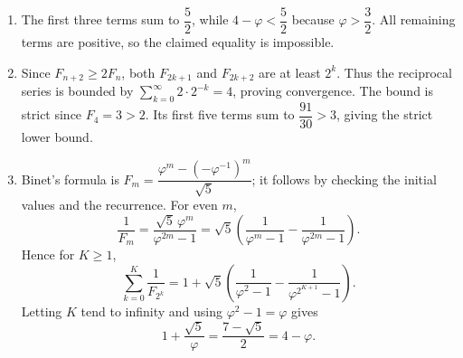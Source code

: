 \begin{enumerate}
\item The first three terms sum to $\dfrac{5}{2}$, while $4-\varphi<\dfrac{5}{2}$ because $\varphi>\dfrac{3}{2}$. All remaining terms are positive, so the claimed equality is impossible.
\item Since $F_{n+2}\ge2F_n$, both $F_{2k+1}$ and $F_{2k+2}$ are at least $2^k$. Thus the reciprocal series is bounded by $\sum_{k=0}^{\infty}2\cdot2^{-k}=4$, proving convergence. The bound is strict since $F_4=3>2$. Its first five terms sum to $\dfrac{91}{30}>3$, giving the strict lower bound.
\item Binet's formula is $F_m=\dfrac{\varphi^m-(-\varphi^{-1})^m}{\sqrt5}$; it follows by checking the initial values and the recurrence. For even $m$,
\[
\dfrac{1}{F_m}=\dfrac{\sqrt5\,\varphi^m}{\varphi^{2m}-1}
=\sqrt5\left(\dfrac{1}{\varphi^m-1}-\dfrac{1}{\varphi^{2m}-1}\right).
\]
Hence for $K\ge1$,
\[
\sum_{k=0}^K\dfrac{1}{F_{2^k}}
=1+\sqrt5\left(\dfrac{1}{\varphi^2-1}-\dfrac{1}{\varphi^{2^{K+1}}-1}\right).
\]
Letting $K$ tend to infinity and using $\varphi^2-1=\varphi$ gives
\[
1+\dfrac{\sqrt5}{\varphi}=\dfrac{7-\sqrt5}{2}=\boxed{4-\varphi}.
\]
\end{enumerate}
